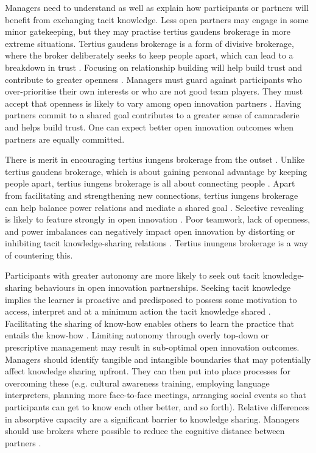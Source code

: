 Managers need to understand as well as explain how participants or partners will benefit from exchanging tacit knowledge. Less open partners may engage in some minor gatekeeping, but they may practise tertius gaudens brokerage in more extreme situations. Tertius gaudens brokerage is a form of divisive brokerage, where the broker deliberately seeks to keep people apart, which can lead to a breakdown in trust \citep{obstfeld2014brokerage}. Focusing on relationship building will help build trust and contribute to greater openness \citep{chiambaretto2019all}. Managers must guard against participants who over-prioritise their own interests or who are not good team players. They must accept that openness is likely to vary among open innovation partners \citep{dahlander2010open,oberg2019openness}. Having partners commit to a shared goal contributes to a greater sense of camaraderie and helps build trust. One can expect better open innovation outcomes when partners are equally committed. \medskip

There is merit in encouraging tertius iungens brokerage from the outset \citep{chiambaretto2019all}. Unlike tertius gaudens brokerage, which is about gaining personal advantage by keeping people apart, tertius iungens brokerage is all about connecting people \citep{obstfeld2014brokerage}. Apart from facilitating and strengthening new connections, tertius iungens brokerage can help balance power relations and mediate a shared goal \citep{chesbrough2012open}. Selective revealing is likely to feature strongly in open innovation \citep{kratzer2017open}. Poor teamwork, lack of openness, and power imbalances can negatively impact open innovation by distorting or inhibiting tacit knowledge-sharing relations \citep{bogers2018human}. Tertius inungens brokerage is a way of countering this. \medskip

Participants with greater autonomy are more likely to seek out tacit knowledge-sharing behaviours in open innovation partnerships. Seeking tacit knowledge implies the learner is proactive and predisposed to possess some motivation to access, interpret and at a minimum action the tacit knowledge shared \citep{gubbins2021delineating}. Facilitating the sharing of know-how enables others to learn the practice that entails the know-how \citep{cook1999bridging}. Limiting autonomy through overly top-down or prescriptive management may result in sub-optimal open innovation outcomes. Managers should identify tangible and intangible boundaries that may potentially affect knowledge sharing upfront. They can then put into place processes for overcoming these (e.g. cultural awareness training, employing language interpreters, planning more face-to-face meetings, arranging social events so that participants can get to know each other better, and so forth). Relative differences in absorptive capacity are a significant barrier to knowledge sharing. Managers should use brokers where possible to reduce the cognitive distance between partners \citep{kokshagina2017fast}. \medskip

